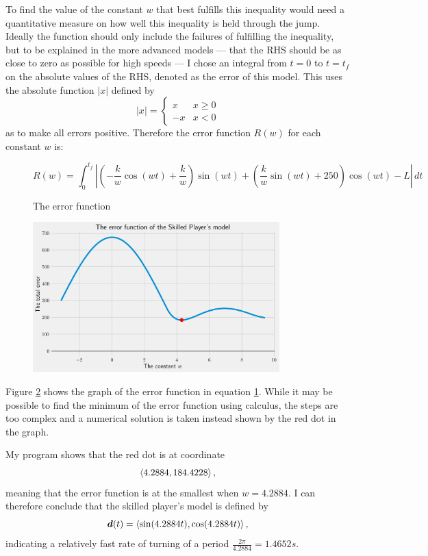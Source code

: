 To find the value of the constant $w$ that best fulfills this inequality would need a quantitative measure on how well this inequality is held through the jump. Ideally the function should only include the failures of fulfilling the inequality, but to be explained in the more advanced models --- that the RHS should be as close to zero as possible for high speeds --- I chose an integral from $t=0$ to $t=t_f$ on the absolute values of the RHS, denoted as the error of this model. This uses the absolute function $|x|$ defined by
\[
 |x| = \begin{cases}
         x & x \geq 0\\
         -x & x < 0
        \end{cases}
\]
as to make all errors positive. Therefore the error function $R(w)$ for each constant $w$ is:
\begin{figure}[H]
 \centering
 \[
  R(w) = \int_0^{t_f} \left|\left(-\frac{k}{w} \cos(wt) + \frac{k}{w}\right) \sin(wt) + \left(\frac{k}{w} \sin(wt) + 250\right) \cos(wt) - L\right| \, dt
 \]
 \caption{The error function}
 \label{eq:2error}
\end{figure}


\begin{figure}[H]
 \centering
 \includegraphics[width=0.85\textwidth]{assets/restriction_equation.png}
 \caption{}
 \label{fig:2error}
\end{figure}
Figure \ref{fig:2error} shows the graph of the error function in equation \ref{eq:2error}. While it may be possible to find the minimum of the error function using calculus, the steps are too complex and a numerical solution is taken instead shown by the red dot in the graph.

My program shows that the red dot is at coordinate
\[
    \left\langle 4.2884, 184.4228 \right\rangle,
\]
meaning that the error function is at the smallest when $w=4.2884$. I can therefore conclude that the skilled player's model is defined by
\[
    \boldsymbol{d}(t) = \left\langle \sin(4.2884t), \cos(4.2884t) \right\rangle,
\]
indicating a relatively fast rate of turning of a period $\frac{2\pi}{4.2884} = 1.4652\si{s}$.

